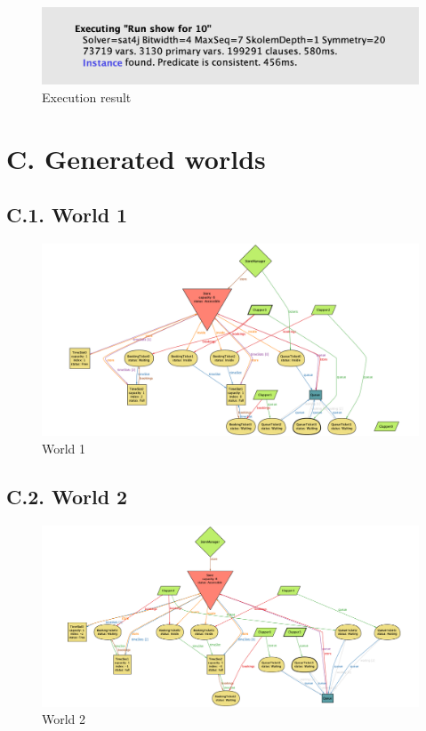 \begin{figure}[H]
\centering
\includegraphics{alloy/execution_result}
\caption{Execution result}
\end{figure}

\section{C. Generated worlds}

\subsection{C.1. World 1}

\begin{figure}[H]
\centering
\includegraphics{alloy/world_1}
\caption{World 1}
\end{figure}

\subsection{C.2. World 2}

\begin{figure}[H]
\centering
\includegraphics{alloy/world_2}
\caption{World 2}
\end{figure}

